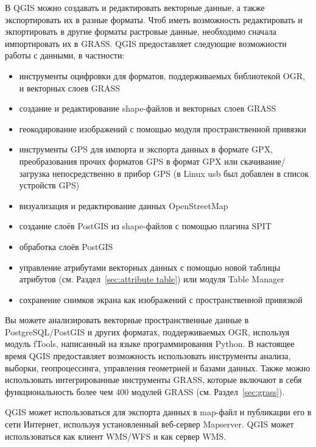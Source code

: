 
В QGIS можно создавать и редактировать векторные данные, а также
экспортировать их в разные форматы. Чтоб иметь возможность редактировать
и экпортировать в другие форматы растровые данные, необходимо
сначала импортировать их в GRASS. QGIS предоставляет следующие возможности
работы с данными, в частности:

\begin{itemize}[label=--]
\item инструменты оцифровки для форматов, поддерживаемых библиотекой OGR,
и векторных слоев GRASS
\item создание и редактирование shape-файлов и векторных слоев GRASS
\item геокодирование изображений с помощью модуля пространственной
привязки
\item инструменты GPS для импорта и экспорта данных в формате GPX,
преобразования прочих форматов GPS в формат GPX или скачивание/загрузка
непосредственно в прибор GPS (в Linux usb был добавлен в список
устройств GPS)
\item визуализация и редактирование данных OpenStreetMap
\item создание слоёв PostGIS из shape-файлов с помощью плагина SPIT
\item обработка слоёв PostGIS
\item управление атрибутами векторных данных с помощью новой таблицы
атрибутов (см. Раздел~\ref{sec:attribute table}) или модуля Table Manager
\item сохранение снимков экрана как изображений с пространственной
привязкой
\end{itemize}


Вы можете анализировать векторные пространственные данные в PostgreSQL/PostGIS
и других форматах, поддерживаемых OGR, используя модуль fTools, написанный на
языке программирования Python. В настоящее время QGIS предоставляет возможность
использовать инструменты анализа, выборки, геопроцессинга, управления
геометрией и базами данных. Также можно использовать интегрированные
инструменты GRASS, которые включают в себя функциональность более чем
400 модулей GRASS (см. Раздел~\ref{sec:grass}).


QGIS может использоваться для экспорта данных в map-файл и публикации
его в сети Интернет, используя установленный веб-сервер Mapserver.
QGIS может использоваться как клиент WMS/WFS и как сервер WMS.

